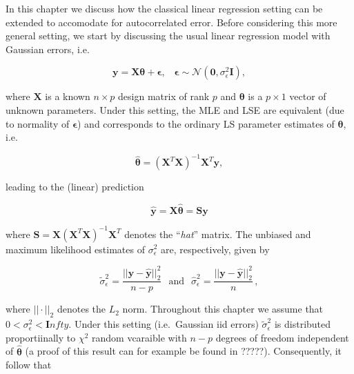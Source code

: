 \documentclass[]{book}
\theoremstyle{definition}
\theoremstyle{definition}
\theoremstyle{definition}
\theoremstyle{remark}
\begin{document}
{In this chapter we discuss how the classical linear regression setting
can be extended to accomodate for autocorrelated error. Before
considering this more general setting, we start by discussing the usual
linear regression model with Gaussian errors, i.e.

\begin{equation*}
 \mathbf{y} = \mathbf{X} \boldsymbol{\theta} + \boldsymbol{\epsilon}, \;\;\; \boldsymbol{\epsilon} \sim \mathcal{N}\left( \boldsymbol{0},\sigma_{\epsilon}^2 \mathbf{I} \right) ,
\end{equation*}

where \(\mathbf{X}\) is a known \(n \times p\) design matrix of rank
\(p\) and \(\boldsymbol{\theta}\) is a \(p \times 1\) vector of unknown
parameters. Under this setting, the MLE and LSE are equivalent (due to
normality of \(\boldsymbol{\epsilon}\)) and corresponds to the ordinary
LS parameter estimates of \(\boldsymbol{\theta}\), i.e.

\begin{equation}
    \hat{\boldsymbol{\theta}} = \left(\mathbf{X}^T \mathbf{X} \right)^{-1} \mathbf{X}^T \mathbf{y} ,
    \label{eq:betaLSE}
\end{equation}

leading to the (linear) prediction

\begin{equation*}
    \hat{\mathbf{y}} = \mathbf{X} \hat{\boldsymbol{\theta}} = \mathbf{S} \mathbf{y}
\end{equation*}

where
\(\mathbf{S} = \mathbf{X}\left(\mathbf{X}^T \mathbf{X} \right)^{-1} \mathbf{X}^T\)
denotes the ``\emph{hat}'' matrix. The unbiased and maximum likelihood
estimates of \(\sigma^2_{\epsilon}\) are, respectively, given by

\begin{equation}
        \tilde{\sigma}^2_{\epsilon} = \frac{||\mathbf{y} - \hat{\mathbf{y}} ||_2^2}{n - p} \;\;\, \text{and} \;\;\,
        \hat{\sigma}^2_{\epsilon} = \frac{||\mathbf{y} - \hat{\mathbf{y}} ||_2^2}{n}\,,
    \label{eq:LM:sig2:hat}
\end{equation}

where \(|| \cdot ||_2\) denotes the \(L_2\) norm. Throughout this
chapter we assume that \(0 < \sigma_{\epsilon}^2 < \mathbf{I}nfty\).
Under this setting (i.e.~Gaussian iid errors)
\(\tilde{\sigma}^2_{\epsilon}\) is distributed proportiinally to
\(\chi^2\) random vcaraible with \(n-p\) degrees of freedom independent
of \(\hat{\boldsymbol{\theta}}\) (a proof of this result can for example
be found in ?????). Consequently, it follow that

}
\end{document}
